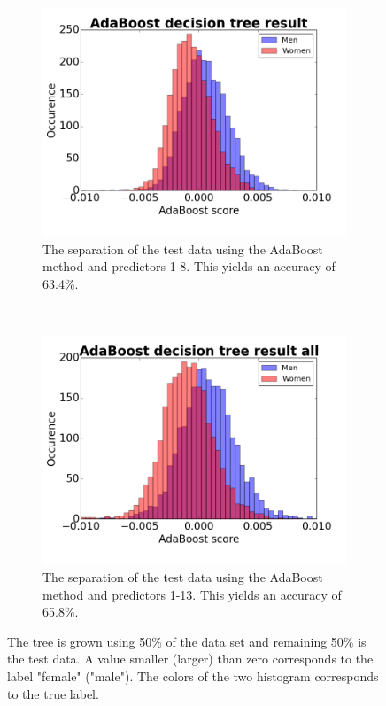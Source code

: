 \documentclass[a4paper,11pt]{article}
\begin{document}
\begin{figure}[h]
    \centering
    \begin{subfigure}[b]{0.45\textwidth}
        \includegraphics[width=\textwidth]{Pix/HistAdaB82.png}
		\caption{The separation of the test data using the AdaBoost method and predictors 1-8. This yields an accuracy of 63.4\%.}
		\label{fig:AdaBoost8}
    \end{subfigure}
    ~
    \begin{subfigure}[b]{0.45\textwidth}
		\includegraphics[width=\textwidth]{Pix/HIstAdaAll2.png}
		\caption{The separation of the test data using the AdaBoost method and predictors 1-13. This yields an accuracy of 65.8\%.}
		\label{fig:AdaBoostAll}
    \end{subfigure}
    \caption{The tree is grown using 50\% of the data set and remaining 50\% is the test data. A value smaller (larger) than zero corresponds to the label "female" ("male"). The colors of the two histogram corresponds to the true label.}
	\label{fig:AdaBoost}
\end{figure}
\end{document}
